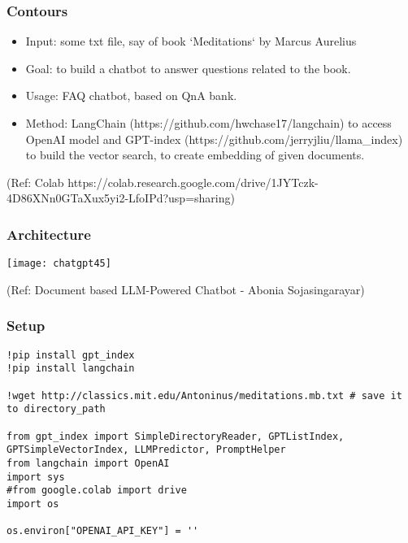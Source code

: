 \begin{frame}[fragile]\frametitle{Contours}

\begin{itemize}
\item Input: some txt file, say of book `Meditations` by Marcus Aurelius
\item Goal: to build a chatbot to answer questions related to the book.
\item Usage: FAQ chatbot, based on QnA bank.
\item Method: LangChain (https://github.com/hwchase17/langchain) to access OpenAI model and GPT-index (https://github.com/jerryjliu/llama\_index) to build the vector search, to create embedding of given documents.
\end{itemize}	 

{\tiny (Ref: Colab https://colab.research.google.com/drive/1JYTczk-4D86XNn0GTaXux5yi2-LfoIPd?usp=sharing)}

\end{frame}

\begin{frame}[fragile]\frametitle{Architecture}

\begin{center}
\texttt{[image: chatgpt45]}

{\tiny (Ref: Document based LLM-Powered Chatbot - Abonia Sojasingarayar)}

\end{center}		


\end{frame}


\begin{frame}[fragile]\frametitle{Setup}


\begin{lstlisting}
!pip install gpt_index
!pip install langchain

!wget http://classics.mit.edu/Antoninus/meditations.mb.txt # save it to directory_path

from gpt_index import SimpleDirectoryReader, GPTListIndex, GPTSimpleVectorIndex, LLMPredictor, PromptHelper
from langchain import OpenAI
import sys
#from google.colab import drive
import os

os.environ["OPENAI_API_KEY"] = ''
\end{lstlisting}



\end{frame}

